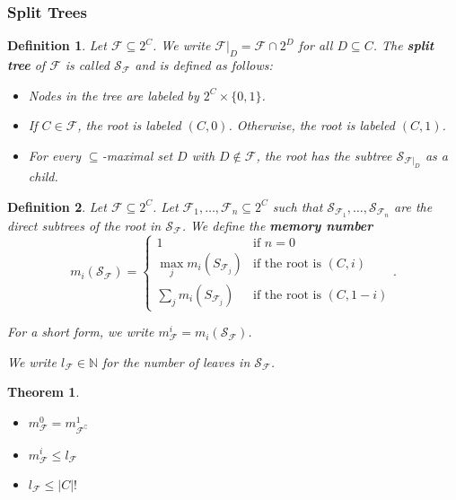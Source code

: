 \documentclass{article}
\newtheorem{theorem}{Theorem}
\newtheorem{definition}{Definition}
\begin{document}
\subsubsection{Split Trees}
\begin{definition}
	Let $\mathcal{F} \subseteq 2^C$. We write $\mathcal{F}|_D = \mathcal{F} \cap 2^D$ for all $D \subseteq C$. The \textbf{split tree} of $\mathcal{F}$ is called $\mathcal{S}_\mathcal{F}$ and is defined as follows: 
	\begin{itemize}
		\item Nodes in the tree are labeled by $2^C \times \{0,1\}$.
		\item If $C \in \mathcal{F}$, the root is labeled $(C, 0)$. Otherwise, the root is labeled $(C, 1)$.
		\item For every $\subseteq$-maximal set $D$ with $D \notin \mathcal{F}$, the root has the subtree $\mathcal{S}_{\mathcal{F}|_D}$ as a child.
	\end{itemize}
\end{definition}

\begin{definition}
	Let $\mathcal{F} \subseteq 2^C$. Let $\mathcal{F}_1, \dots, \mathcal{F}_n \subseteq 2^C$ such that $\mathcal{S}_{\mathcal{F}_1}, \dots, \mathcal{S}_{\mathcal{F}_n}$ are the direct subtrees of the root in $\mathcal{S}_\mathcal{F}$. We define the \textbf{memory number} 
	$$m_i(\mathcal{S}_\mathcal{F}) = \begin{cases}
		1 & \text{if } n = 0 \\
		\max_j m_i(S_{\mathcal{F}_j}) & \text{if the root is } (C, i) \\
		\sum_j m_i(S_{\mathcal{F}_j}) & \text{if the root is } (C, 1-i) 
	\end{cases}.$$
	
	For a short form, we write $m^i_\mathcal{F} = m_i(\mathcal{S}_\mathcal{F})$.
	
	We write $l_\mathcal{F} \in \mathbb{N}$ for the number of leaves in $\mathcal{S}_\mathcal{F}$.
\end{definition}

\begin{theorem}
\begin{itemize}
	\item $m^0_\mathcal{F} = m^1_{\mathcal{F}^\complement}$
	\item $m^i_\mathcal{F} \leq l_\mathcal{F}$
	\item $l_\mathcal{F} \leq |C|!$
\end{itemize}
\end{theorem}
\end{document}
